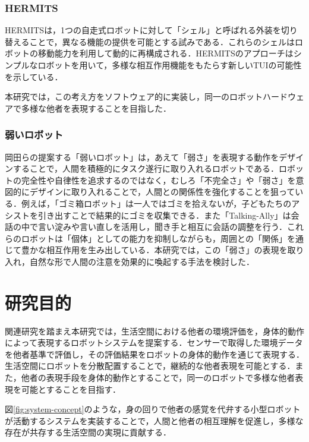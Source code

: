 \documentclass{cuxarticle}
\begin{document}
\subsubsection{HERMITS}
HERMITS\cite{--HERMITSProceedings33rdAnnual}は，1つの自走式ロボットに対して「シェル」と呼ばれる外装を切り替えることで，異なる機能の提供を可能とする試みである．これらのシェルはロボットの移動能力を利用して動的に再構成される．HERMITSのアプローチはシンプルなロボットを用いて，多様な相互作用機能をもたらす新しいTUIの可能性を示している．

本研究では，この考え方をソフトウェア的に実装し，同一のロボットハードウェアで多様な他者を表現することを目指した．

\subsubsection{弱いロボット}
岡田らの提案する「弱いロボット」\cite{岡田-2017-弱いロボ}は，あえて「弱さ」を表現する動作をデザインすることで，人間を積極的にタスク遂行に取り入れるロボットである．ロボットの完全性や自律性を追求するのではなく，むしろ「不完全さ」や「弱さ」を意図的にデザインに取り入れることで，人間との関係性を強化することを狙っている．例えば，「ゴミ箱ロボット」\cite{岡田美智男-2012-ゴミ箱ロ}は一人ではゴミを拾えないが，子どもたちのアシストを引き出すことで結果的にゴミを収集できる．また「Talking-Ally」\cite{岡田美智男-2012-ゴミ箱ロ}は会話の中で言い淀みや言い直しを活用し，聞き手と相互に会話の調整を行う．これらのロボットは「個体」としての能力を抑制しながらも，周囲との「関係」を通じて豊かな相互作用を生み出している．本研究では，この「弱さ」の表現を取り入れ，自然な形で人間の注意を効果的に喚起する手法を検討した．

\section{研究目的}
関連研究を踏まえ本研究では，生活空間における他者の環境評価を，身体的動作によって表現するロボットシステムを提案する．センサーで取得した環境データを他者基準で評価し，その評価結果をロボットの身体的動作を通じて表現する．生活空間にロボットを分散配置することで，継続的な他者表現を可能とする．また，他者の表現手段を身体的動作とすることで，同一のロボットで多様な他者表現を可能とすることを目指す．

図\ref{fig:system-concept}のような，身の回りで他者の感覚を代弁する小型ロボットが活動するシステムを実装することで，人間と他者の相互理解を促進し，多様な存在が共存する生活空間の実現に貢献する．
\end{document}

